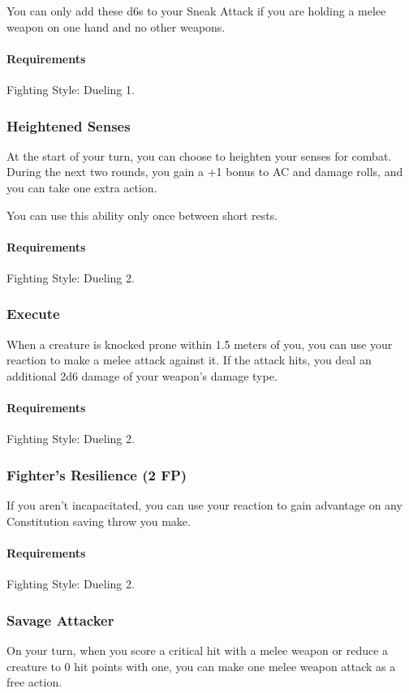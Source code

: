     You can only add these d6s to your Sneak Attack if you are holding a melee weapon on one hand and no other weapons.
    \paragraph{Requirements} Fighting Style: Dueling 1.
\subsubsection{Heightened Senses} \label{feat::heightenedsenses}
    At the start of your turn, you can choose to heighten your senses for combat.
    During the next two rounds, you gain a +1 bonus to AC and damage rolls, and you can take one extra action.

    You can use this ability only once between short rests.
    \paragraph{Requirements} Fighting Style: Dueling 2.
\subsubsection{Execute} \label{feat::execute}
    When a creature is knocked prone within 1.5 meters of you, you can use your reaction to make a melee attack against it.
    If the attack hits, you deal an additional 2d6 damage of your weapon's damage type.
    \paragraph{Requirements} Fighting Style: Dueling 2.
\subsubsection{Fighter's Resilience (2 FP)} \label{feat::fightersresilience}
    If you aren't incapacitated, you can use your reaction to gain advantage on any Constitution saving throw you make.
    \paragraph{Requirements} Fighting Style: Dueling 2.
\subsubsection{Savage Attacker} \label{feat::savageattacker}
    On your turn, when you score a critical hit with a melee weapon or reduce a creature to 0 hit points with one, you can make one melee weapon attack as a free action.
